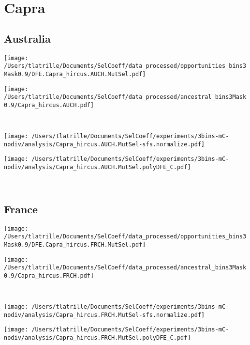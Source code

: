 \documentclass{article}
\begin{document}
    \section{Capra}

    \subsection{Australia}

    \begin{minipage}{0.49\linewidth}
        \texttt{[image: /Users/tlatrille/Documents/SelCoeff/data\_processed/opportunities\_bins3Mask0.9/DFE.Capra\_hircus.AUCH.MutSel.pdf]}
    \end{minipage}
    \begin{minipage}{0.49\linewidth}
        \texttt{[image: /Users/tlatrille/Documents/SelCoeff/data\_processed/ancestral\_bins3Mask0.9/Capra\_hircus.AUCH.pdf]}
    \end{minipage}
    \\
    \begin{minipage}{0.49\linewidth}
        \texttt{[image: /Users/tlatrille/Documents/SelCoeff/experiments/3bins-mC-nodiv/analysis/Capra\_hircus.AUCH.MutSel-sfs.normalize.pdf]}
    \end{minipage}
    \begin{minipage}{0.49\linewidth}
        \texttt{[image: /Users/tlatrille/Documents/SelCoeff/experiments/3bins-mC-nodiv/analysis/Capra\_hircus.AUCH.MutSel.polyDFE\_C.pdf]}
    \end{minipage}
    \\
    \subsection{France}

    \begin{minipage}{0.49\linewidth}
        \texttt{[image: /Users/tlatrille/Documents/SelCoeff/data\_processed/opportunities\_bins3Mask0.9/DFE.Capra\_hircus.FRCH.MutSel.pdf]}
    \end{minipage}
    \begin{minipage}{0.49\linewidth}
        \texttt{[image: /Users/tlatrille/Documents/SelCoeff/data\_processed/ancestral\_bins3Mask0.9/Capra\_hircus.FRCH.pdf]}
    \end{minipage}
    \\
    \begin{minipage}{0.49\linewidth}
        \texttt{[image: /Users/tlatrille/Documents/SelCoeff/experiments/3bins-mC-nodiv/analysis/Capra\_hircus.FRCH.MutSel-sfs.normalize.pdf]}
    \end{minipage}
    \begin{minipage}{0.49\linewidth}
        \texttt{[image: /Users/tlatrille/Documents/SelCoeff/experiments/3bins-mC-nodiv/analysis/Capra\_hircus.FRCH.MutSel.polyDFE\_C.pdf]}
    \end{minipage}
    \\
\end{document}

